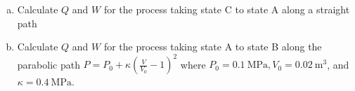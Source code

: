 \begin{enumerate}
\begin{enumerate}[(a)]
{\begin{align*}
{              (\SI{0.03}{\meter\cubed})}{(\SI{0.02}{\meter\cubed})} +
            (\SI{0.2e6}{\pascal})\right)[(\SI{0.01}{\meter\cubed})
            - (\SI{0.03}{\meter\cubed})]  \\
            \Aboxed{W &= \SI{1000}{\joule}} \\
            Q &= \Delta U - W \\
            \Delta U &= 5(P_2V_2 - P_1V_1) \\
            \Delta U &=
            5[(\SI{0.5e6}{\pascal})(\SI{0.01}{\meter\cubed}) -
              (\SI{0.2e6}{\pascal})(\SI{0.03}{\meter\cubed})
            ] \\
            \Delta U &= \SI{-5000}{\joule} \\
            Q &= \SI{-5000}{\joule} -  \SI{1000}{\joule} \\
            \Aboxed{Q &= \SI{-6000}{\joule}}
          \end{align*}
        }

        \pagebreak

      \item Calculate $Q$ and $W$ for the process taking state C to
        state A along a straight path


      \item Calculate $Q$ and $W$ for the process taking state A to
        state B along the parabolic path $P = P_0 +
        \kappa\left(\frac{V}{V_0} - 1\right)^2$ where
        $P_0 = \SI{0.1}{\mega\pascal}, V_0 = \SI{0.02}{\meter\cubed}$, and
        $\kappa = \SI{0.4}{\mega\pascal}$.


\end{enumerate}
\end{enumerate}
